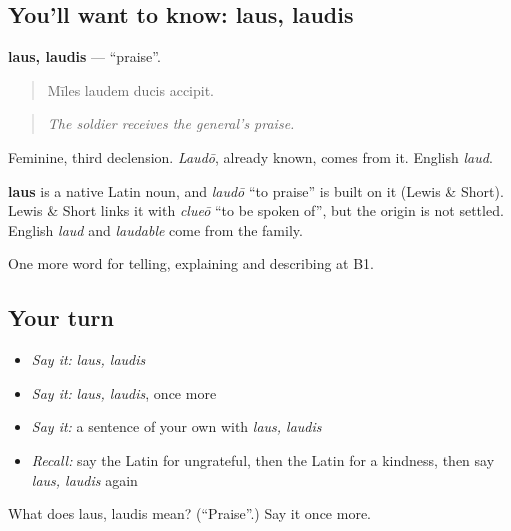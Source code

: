 \subsection*{You'll want to know: laus, laudis}
\textbf{laus, laudis} — \textquotedblleft{}praise\textquotedblright{}.

\begin{quote}
Mīles laudem ducis accipit.
\end{quote}

\begin{quote}
\emph{The soldier receives the general's praise.}
\end{quote}

Feminine, third declension. \emph{Laudō}, already known, comes from it. English \emph{laud}.

\begin{cousinweb}
\textbf{laus} is a native Latin noun, and \emph{laudō} \textquotedblleft{}to praise\textquotedblright{} is built on it (Lewis \& Short). Lewis \& Short links it with \emph{clueō} \textquotedblleft{}to be spoken of\textquotedblright{}, but the origin is not settled. English \emph{laud} and \emph{laudable} come from the family.
\end{cousinweb}

\begin{grammarlens}[title={What you've built}]
One more word for telling, explaining and describing at B1.
\end{grammarlens}

\subsection*{Your turn}
\begin{itemize}
\raggedright
  \item \emph{Say it:} \emph{laus, laudis}
  \item \emph{Say it:} \emph{laus, laudis}, once more
  \item \emph{Say it:} a sentence of your own with \emph{laus, laudis}
  \item \emph{Recall:} say the Latin for ungrateful, then the Latin for a kindness, then say \emph{laus, laudis} again
\end{itemize}

\begin{tcolorbox}[breakable,colback=teal!4,colframe=teal!35!black,title={Before you move on}]
What does laus, laudis mean? (\textquotedblleft{}Praise\textquotedblright{}.) Say it once more.
\end{tcolorbox}
